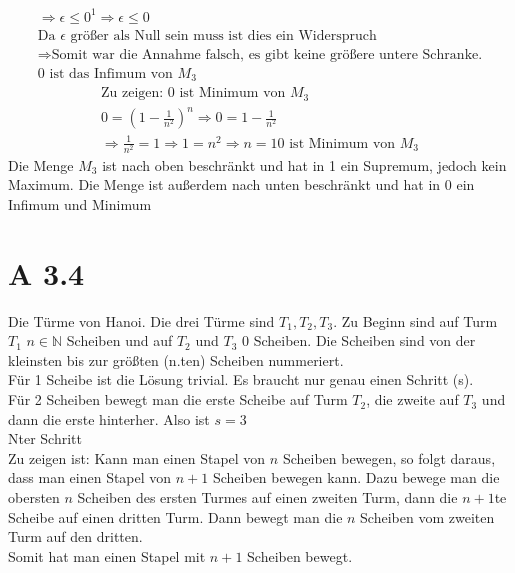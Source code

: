 \documentclass{article}
\begin{document}
\begin{enumerate}[label = (\alph*)]
\begin{gather*}
                    \Rightarrow \epsilon \leq 0^1 \Rightarrow \epsilon \leq 0 \\
                    \text{Da } \epsilon \text{ größer als Null sein muss ist dies ein Widerspruch} \\
                    \Rightarrow \text{Somit war die Annahme falsch, es gibt keine größere untere Schranke.} \\
                    \text{0 ist das Infimum von } M_3
                \end{gather*}
                \begin{gather*}
                    \text{Zu zeigen: 0 ist Minimum von } M_3 \\
                    0 =  {\left(1- \frac{1}{n^2}\right)}^n \Rightarrow 0 = 1- \frac{1}{n^2} \\
                    \Rightarrow \frac{1}{n^2} = 1 \Rightarrow 1 = n^2 \Rightarrow n = 1
                    \text{0 ist Minimum von } M_3
                \end{gather*}
            Die Menge \(M_3\) ist nach oben beschränkt und hat in 1 ein Supremum, jedoch kein Maximum.
            Die Menge ist außerdem nach unten beschränkt und hat in 0 ein Infimum und Minimum
        \end{enumerate}

        \section*{A 3.4}
                Die Türme von Hanoi. Die drei Türme sind \(T_1, T_2, T_3\). Zu Beginn sind auf Turm \(T_1\) \(n \in \mathbb{N} \) Scheiben und auf \(T_2\) und \(T_3\) 0 Scheiben.
                Die Scheiben sind von der kleinsten bis zur größten (n.ten) Scheiben nummeriert. \\
                Für 1 Scheibe ist die Lösung trivial. Es braucht nur genau einen Schritt (s). \\
                Für 2 Scheiben bewegt man die erste Scheibe auf Turm \(T_2\), die zweite auf \(T_3\) und dann die erste hinterher. Also ist \(s=3\)\\

                Nter Schritt \\
                Zu zeigen ist: Kann man einen Stapel von \(n\) Scheiben bewegen, so folgt daraus, dass man einen Stapel von \(n+1\) Scheiben bewegen kann.
                Dazu bewege man die obersten \(n\) Scheiben des ersten Turmes auf einen zweiten Turm, dann die \(n+1\)te Scheibe auf einen dritten Turm.
                Dann bewegt man die \(n\) Scheiben vom zweiten Turm auf den dritten. \\
                Somit hat man einen Stapel mit \(n+1\) Scheiben bewegt. \\
\end{document}
